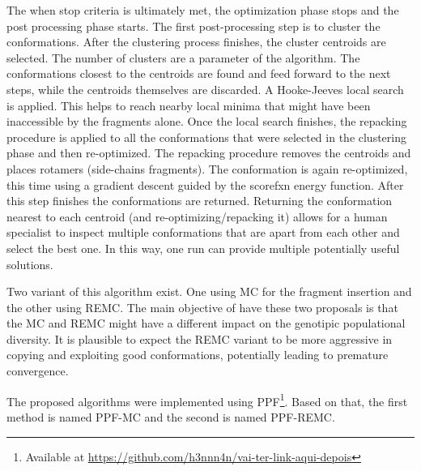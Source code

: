 The when stop criteria is ultimately met, the optimization phase stops and the
post processing phase starts. The first post-processing step is to cluster the
conformations. After the clustering process finishes, the cluster centroids are
selected. The number of clusters are a parameter of the algorithm.
The conformations closest to the centroids are found and feed forward
to the next steps, while the centroids themselves are discarded. A Hooke-Jeeves
local search is applied. This helps to reach nearby local minima that might have
been inaccessible by the fragments alone. Once the local search finishes, the
repacking procedure is applied to all the conformations that were selected in
the clustering phase and then re-optimized. The repacking procedure removes the
centroids and places rotamers (side-chains fragments). The conformation is again
re-optimized, this time using a gradient descent guided by the scorefxn energy
function. After this step finishes the conformations are returned. Returning
the conformation nearest to each centroid (and re-optimizing/repacking it) allows
for a human specialist to inspect multiple conformations that are apart from
each other and select the best one. In this way, one run can provide multiple
potentially useful solutions.

Two variant of this algorithm exist. One using \ac{MC} for the fragment insertion
and the other using \ac{REMC}.
The main objective of have these two proposals is that the \ac{MC} and \ac{REMC}
might have a different impact on the genotipic populational diversity. It is
plausible to expect the \ac{REMC} variant to be more aggressive in copying and
exploiting good conformations, potentially leading to premature convergence.

The proposed algorithms were implemented using \ac{PPF}\footnote{Available at
\url{https://github.com/h3nnn4n/vai-ter-link-aqui-depois}}. Based on that, the
first method is named PPF-MC and the second is named PPF-REMC.
